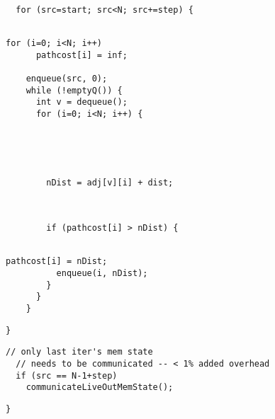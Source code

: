\begin{lstlisting}[morekeywords={pathcost}, aboveskip=0pt,
belowskip=0pt, firstnumber=25,name=dij_checks,showlines=true]

  for (src=start; src<N; src+=step) {


\end{lstlisting}
\begin{lstlisting}[morekeywords={pathcost,dist}, aboveskip=0pt,
belowskip=0pt, firstnumber=28,name=dij_checks,showlines=true]
    for (i=0; i<N; i++)
      pathcost[i] = inf;

    enqueue(src, 0);
    while (!emptyQ()) {
      int v = dequeue();
      for (i=0; i<N; i++) {
\end{lstlisting}
\begin{lstlisting}[morekeywords={pathcost,dist,nDist}, aboveskip=0pt,
belowskip=0pt, firstnumber=auto,name=dij_checks,showlines=true]




        nDist = adj[v][i] + dist;
\end{lstlisting}
\begin{lstlisting}[morekeywords={pathcost}, aboveskip=0pt,
belowskip=0pt, firstnumber=auto,name=dij_checks,showlines=true]


        if (pathcost[i] > nDist) {


\end{lstlisting}
\begin{lstlisting}[morekeywords={pathcost}, aboveskip=0pt,
belowskip=0pt, firstnumber=auto,name=dij_checks]
          pathcost[i] = nDist;
          enqueue(i, nDist);
        }
      }
    }
\end{lstlisting}

\begin{lstlisting}[morekeywords={pathcost,dist}, aboveskip=0pt,
belowskip=0pt, firstnumber=auto,name=dij_checks,showlines=true]
  }

\end{lstlisting}

\begin{lstlisting}[morekeywords={pathcost},
aboveskip=0pt,belowskip=0pt,backgroundcolor=\color{lightgray},
firstnumber=auto, name=dij_checks,showlines=true]
  // only last iter's mem state
  // needs to be communicated -- < 1% added overhead
  if (src == N-1+step)
    communicateLiveOutMemState();
\end{lstlisting}

\begin{lstlisting}[morekeywords={pathcost}, aboveskip=0pt,
belowskip=0pt, firstnumber=auto,name=dij_checks]
}
\end{lstlisting}
